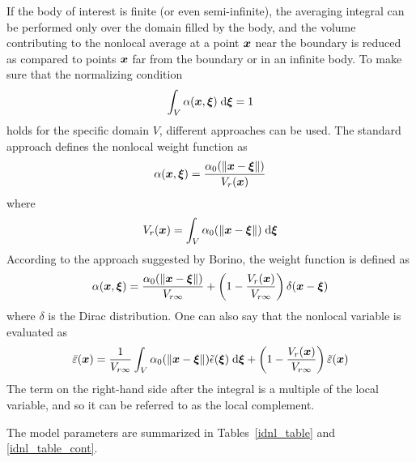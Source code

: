 \documentclass[a4paper]{article}
\newcommand{\mbf}[1]{\mbox{\boldmath$#1$}}
\begin{document}
If the body of interest is finite (or even semi-infinite), the averaging
integral can be performed only over
the domain filled by the body, and the volume contributing to the nonlocal
average at a point $\mbf{x}$ near the boundary is reduced as compared to 
points  $\mbf{x}$ far from the boundary or in an infinite body. To make sure
that the normalizing condition
$$
\int_{V} \alpha(\mbf{x},\mbf{\xi})\;{\rm d}\mbf{\xi} = 1
$$
holds for the specific domain $V$, different approaches can be used.
The standard approach defines the nonlocal weight function as  
$$
\alpha(\mbf{x},\mbf{\xi})=\frac{\alpha_0(\Vert\mbf{x}-\mbf{\xi}\Vert)}{V_r(\mbf{x})}
$$
where
$$
V_r(\mbf{x}) = \int_{V} \alpha_0(\Vert\mbf{x}-\mbf{\xi}\Vert)\;{\rm d}\mbf{\xi} 
$$
According to the approach suggested by Borino, the weight function is defined as
$$
\alpha(\mbf{x},\mbf{\xi})=\frac{\alpha_0(\Vert\mbf{x}-\mbf{\xi}\Vert)}{V_{r\infty}} + \left(1-\frac{V_r(\mbf{x})}{V_{r\infty}}\right)\delta(\mbf{x}-\mbf{\xi})
$$
where $\delta$ is the Dirac distribution. One can also say that the
nonlocal variable is evaluated as
$$
\bar{\varepsilon}(\mbf{x}) = \frac{1}{V_{r\infty}}\int_V\alpha_0(\Vert\mbf{x}-\mbf{\xi}\Vert)\tilde\epsilon(\mbf{\xi})\;{\rm d}\mbf{\xi}+\left(1-\frac{V_r(\mbf{x})}{V_{r\infty}}\right)\tilde\varepsilon(\mbf{x})
$$
The term on the right-hand side after the integral is a multiple of the local
variable, and so it can be referred to as the local complement.  

The model parameters are summarized
in Tables~\ref{idnl_table} and \ref{idnl_table_cont}.
\end{document}
